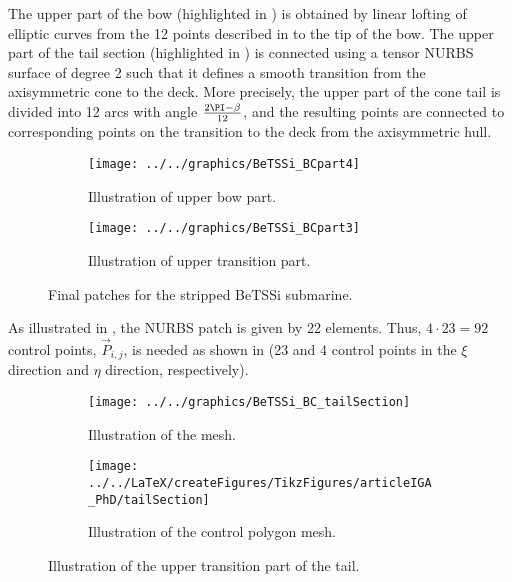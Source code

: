 The upper part of the bow (highlighted in ) is obtained by linear lofting of elliptic curves from the 12 points described in  to the tip of the bow. The upper part of the tail section (highlighted in ) is connected using a tensor NURBS surface of degree 2 such that it defines a smooth transition from the axisymmetric cone to the deck. More precisely, the upper part of the cone tail is divided into 12 arcs with angle $\frac{2\PI-\beta}{12}$, and the resulting points are connected to corresponding points on the transition to the deck from the axisymmetric hull. 
\begin{figure}
	\centering    
	\begin{subfigure}{0.49\textwidth}
		\centering
		\texttt{[image: ../../graphics/BeTSSi\_BCpart4]}
		\caption{Illustration of upper bow part.}
		\label{Fig2:bettsi_upperBow}
	\end{subfigure}%
	\hspace*{0.02\textwidth}%
	\begin{subfigure}{0.49\textwidth}
		\centering
		\texttt{[image: ../../graphics/BeTSSi\_BCpart3]}
		\caption{Illustration of upper transition part.}
		\label{Fig2:bettsi_upperPartOfTailSection}
	\end{subfigure}
	\caption{Final patches for the stripped BeTSSi submarine.}
\end{figure}
As illustrated in , the NURBS patch is given by 22 elements. Thus, $4\cdot 23 = 92$ control points, $\vec{P}_{i,j}$, is needed as shown in  (23 and 4 control points in the $\xi$ direction and $\eta$ direction, respectively).
\begin{figure}
	\centering    
	\begin{subfigure}{0.49\textwidth}
		\centering
		\texttt{[image: ../../graphics/BeTSSi\_BC\_tailSection]}
		\caption{Illustration of the mesh.}
		\label{Fig2:BeTSSi_BC_tailSection}
	\end{subfigure}%
	\hspace*{0.02\textwidth}%
	\begin{subfigure}{0.49\textwidth}
		\centering
		\texttt{[image: ../../LaTeX/createFigures/TikzFigures/articleIGA\_PhD/tailSection]}
		\caption{Illustration of the control polygon mesh.}
		\label{Fig2:BeTSSi_BC_tailSection_cp}
	\end{subfigure}
	\caption{Illustration of the upper transition part of the tail.}
\end{figure}
